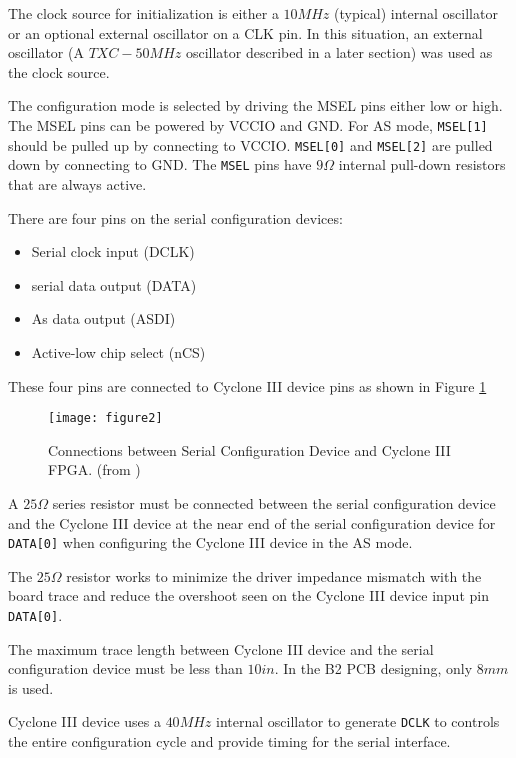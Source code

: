 The clock source for initialization is either a $10MHz$ (typical) internal oscillator or
an optional external oscillator on a CLK pin. In this situation, an external oscillator
(A $TXC-50MHz$ oscillator described in a later section) was used as the clock source.

The configuration mode is selected by driving the MSEL pins either low or high.
The MSEL pins can be powered by VCCIO and GND. For AS mode, \texttt{MSEL[1]} should be pulled up by connecting to VCCIO. \texttt{MSEL[0]} and \texttt{MSEL[2]} are pulled down by connecting to GND. The \texttt{MSEL} pins have $9\Omega$ internal pull-down resistors that are always active.



There are four pins on the serial configuration devices:
\begin{itemize}
 \item Serial clock input (DCLK)
 \item serial data output (DATA)
 \item As data output (ASDI)
 \item Active-low chip select (nCS)
\end{itemize}

These four pins are connected to Cyclone III device pins as shown in Figure \ref{fig:b2_f2}

\begin{figure}
 \centering
 \texttt{[image: figure2]}
 \caption{Connections between Serial Configuration Device and Cyclone III FPGA. (from \citep{Altera:2011:cyclone3handbook})}
 \label{fig:b2_f2}
\end{figure}

A $25\Omega$ series resistor must be connected between the serial configuration device and
the Cyclone III device at the near end of the serial configuration device for \texttt{DATA[0]}
when configuring the Cyclone III device in the AS mode.

The $25\Omega$ resistor works to minimize the driver impedance mismatch with the board trace
and reduce the overshoot seen on the Cyclone III device input pin \texttt{DATA[0]}.

The maximum trace length between Cyclone III device and the serial configuration device must be less than $10in$. In the B2 PCB designing, only $8mm$ is used.

Cyclone III device uses a $40MHz$ internal oscillator to generate \texttt{DCLK} to controls the entire configuration cycle and provide timing for the serial interface.

